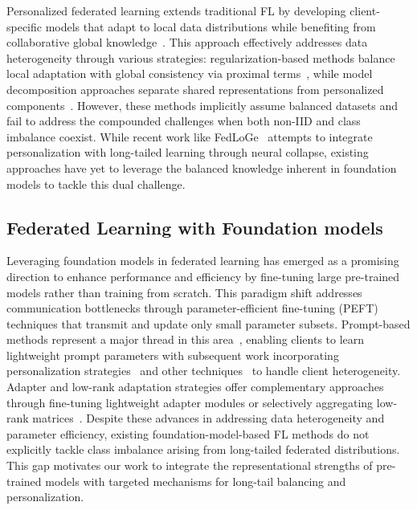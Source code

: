 \documentclass[10pt,twocolumn,letterpaper]{article}
\begin{document}
Personalized federated learning extends traditional FL by developing client-specific models that adapt to local data distributions while benefiting from collaborative global knowledge~\cite{tan2022towards, kairouz2021advances, marfoq2021federated}. This approach effectively addresses data heterogeneity through various strategies: regularization-based methods balance local adaptation with global consistency via proximal terms~\cite{li2021ditto,dinh2020pfedme}, while model decomposition approaches separate shared representations from personalized components~\cite{arivazhagan2019fedper,deng2020apfl,shamsian2021pfedhn}. However, these methods implicitly assume balanced datasets and fail to address the compounded challenges when both non-IID and class imbalance coexist. While recent work like FedLoGe~\cite{xiao2024fedloge} attempts to integrate personalization with long-tailed learning through neural collapse, existing approaches have yet to leverage the balanced knowledge inherent in foundation models to tackle this dual challenge.


\subsection{Federated Learning with Foundation models}

Leveraging foundation models in federated learning has emerged as a promising direction to enhance performance and efficiency by fine-tuning large pre-trained models rather than training from scratch. This paradigm shift addresses communication bottlenecks through parameter-efficient fine-tuning (PEFT) techniques that transmit and update only small parameter subsets. Prompt-based methods represent a major thread in this area~\cite{guo2023promptfl}, enabling clients to learn lightweight prompt parameters with subsequent work incorporating personalization strategies~\cite{pan2024promptfolio,guo2023pfedprompt} and other techniques~\cite{li2024fedotp,cui2024fedpgp,iverson2024pfedmoap} to handle client heterogeneity. Adapter and low-rank adaptation strategies offer complementary approaches through fine-tuning lightweight adapter modules or selectively aggregating low-rank matrices~\cite{lu2023fedclip, wang2024fedsalora}. Despite these advances in addressing data heterogeneity and parameter efficiency, existing foundation-model-based FL methods do not explicitly tackle class imbalance arising from long-tailed federated distributions. This gap motivates our work to integrate the representational strengths of pre-trained models with targeted mechanisms for long-tail balancing and personalization.
\end{document}
